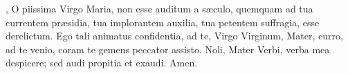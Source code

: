 , O piissima Virgo Maria, non esse auditum a s{\ae}culo, quemquam ad tua currentem pr{\ae}sidia, tua implorantem auxilia, 
tua petentem suffragia, esse derelictum. Ego tali animatus confidentia, ad te, Virgo Virginum, Mater, curro, ad te venio, coram te gemens 
peccator assisto. Noli, Mater Verbi, verba mea despicere; sed audi propitia et exaudi. Amen.